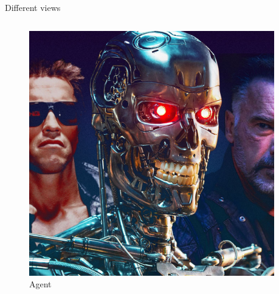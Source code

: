 \begin{frame}{Different views}
	\begin{columns}
		\begin{column}{.5\textwidth}
			\begin{figure}
				\includegraphics[width=.75\textwidth, center]{figures/terminator_001}
				\caption*{Agent}
			\end{figure}
		\end{column}
		\begin{column}{.5\textwidth}
			

\end{column}
\end{columns}
\end{frame}
